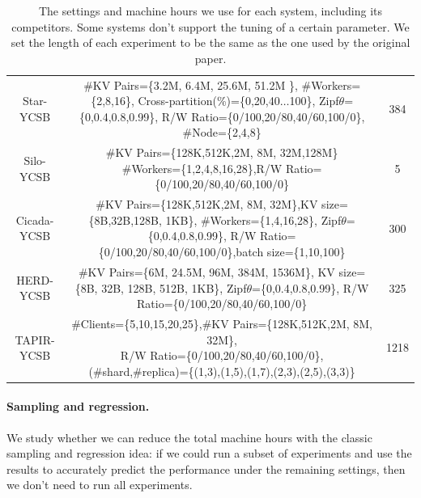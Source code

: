 \begin{table}[ht]
\begin{tabular}{c|c|c}
     \cline{1-3}
     Star-YCSB      &   \specialcell{\#KV Pairs=\{3.2M, 6.4M, 25.6M, 51.2M \}, \#Workers=\{2,8,16\}, \\Cross-partition(\%)=\{0,20,40$\dots$100\},  Zipf$\theta$=\{0,0.4,0.8,0.99\}, \\R/W Ratio=\{0/100,20/80,40/60,100/0\}, \#Node=\{2,4,8\} }   & 384                     \\
     \cline{1-3}
     Silo-YCSB      & \specialcell{\#KV Pairs=\{128K,512K,2M, 8M, 32M,128M\} \\ \#Workers=\{1,2,4,8,16,28\},R/W Ratio=\{0/100,20/80,40/60,100/0\}} & 5\\
     \cline{1-3}
     Cicada-YCSB    &    \specialcell{\#KV Pairs=\{128K,512K,2M, 8M, 32M\},KV size=\{8B,32B,128B, 1KB\},\\ \#Workers=\{1,4,16,28\}, Zipf$\theta$=\{0,0.4,0.8,0.99\},\\ R/W Ratio=\{0/100,20/80,40/60,100/0\},batch size=\{1,10,100\}} & 300 \\
     \cline{1-3}
     HERD-YCSB      &    \specialcell{\#KV Pairs=\{6M, 24.5M, 96M, 384M, 1536M\}, KV size=\{8B, 32B, 128B, 512B, 1KB\},\\ Zipf$\theta$=\{0,0.4,0.8,0.99\}, R/W Ratio=\{0/100,20/80,40/60,100/0\}} & 325                       \\
     \cline{1-3}
     TAPIR-YCSB     &   \specialcell{\#Clients=\{5,10,15,20,25\},\#KV Pairs=\{128K,512K,2M, 8M, 32M\},\\R/W Ratio=\{0/100,20/80,40/60,100/0\},\\ (\#shard,\#replica)=\{(1,3),(1,5),(1,7),(2,3),(2,5),(3,3)\} } & 1218      \\
     
    \end{tabular}
    \caption{The settings and machine hours we use for each system, including its competitors. Some systems don't support the tuning of a certain parameter. We set the length of each experiment to
    be the same as the one used by the original paper.}
    \vspace{-.1in}
    \label{tab:summary}
\end{table}

\vspace{-.1in}
\paragraph{Sampling and regression.}
We study whether we can reduce the total machine hours with the classic
sampling and regression idea: if we could run a subset of experiments and use the results
to accurately predict the performance under the remaining settings, then we don't need to
run all experiments.

